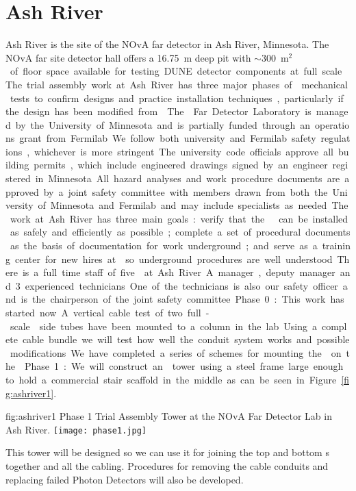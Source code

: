\section{Ash River}

Ash River is the site of the NOvA far detector in Ash River,
Minnesota. The NOvA far site detector hall offers a \SI{16.75}{m} deep
pit with $\sim$\SI{300}{m$^2$} of floor space available for testing
DUNE detector components at full scale.  The trial assembly work at
Ash River has three major phases of  mechanical tests to
confirm designs and practice installation techniques, particularly if
the design has been modified from .  The 
Far Detector Laboratory is managed by the University of Minnesota and
is partially funded through an operations grant from Fermilab.  We follow both
university and Fermilab safety regulations, whichever is more
stringent.  The university code officials approve all building
permits, which include engineered drawings signed by an engineer
registered in Minnesota. All hazard analyses and work procedure
documents are approved by a joint safety committee with members drawn
from both the University of Minnesota and Fermilab and may include
specialists as needed.

The work at Ash River has three main goals: verify that the
  can be installed as safely and efficiently as
possible; complete a set of procedural documents as the basis of
documentation for work underground; and serve as a training center for
new hires at \surf so underground procedures are well understood.

There is a full time staff of five  at Ash River. A manager,
deputy manager and 3 experienced technicians.  One of the technicians
is also our safety officer and is the chairperson of the joint safety
committee.


Phase 0: This work has started now.  A vertical cable test of two
full-scale  side tubes have been mounted to a column in the
lab. Using a complete cable bundle we will test how well the conduit
system works and possible modifications. We have
completed a series of schemes for mounting the 
on the .

Phase 1: We will construct an  tower using a steel frame large
enough to hold a commercial stair scaffold in the middle as can be
seen in Figure ~\ref{fig:ashriver1}.
\begin{dunefigure}{fig:ashriver1}
  {Phase 1 Trial Assembly  Tower at the NOvA Far Detector Lab in Ash River.}
  \texttt{[image: phase1.jpg]}
\end{dunefigure}
This  tower will be designed so we can
use it for joining the top and bottom s together and all the
cabling. Procedures for removing the cable conduits and replacing
failed Photon Detectors will also be developed.

